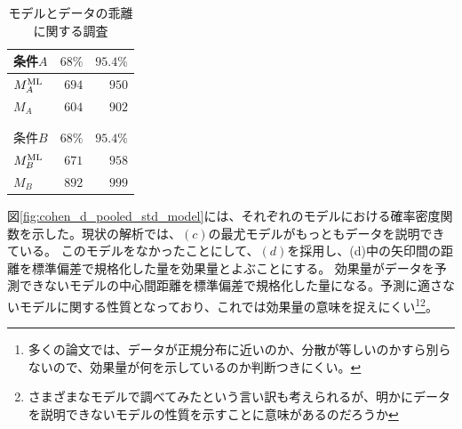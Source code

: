 \begin{table}[hbtp]
 \caption{モデルとデータの乖離に関する調査}
 \label{table:cohen_d_model_data_diff}
 \centering
\begin{tabular}{lrr}
\hline
{}条件$A$ &   $68\%$ &   $95.4\%$ \\
\hline
 $M_A^{\rm{ML}}$& $694$  & $950$ \\
 $M_A$ & $604$  & $902$ \\
\hline \\ \\
\hline
{}条件$B$ &   $68\%$ &   $95.4\%$ \\
\hline
 $M_B^{\rm{ML}}$& $671$  & $958$ \\
 $M_B$ & $892$  & $999$ \\
\hline
\end{tabular}
\end{table}


図\ref{fig:cohen_d_pooled_std_model}には、それぞれのモデルにおける確率密度関数を示した。現状の解析では、$(c)$の最尤モデルがもっともデータを説明できている。
このモデルをなかったことにして、$(d)$を採用し、(d)中の矢印間の距離を標準偏差で規格化した量を効果量とよぶことにする。
効果量がデータを予測できないモデルの中心間距離を標準偏差で規格化した量になる。予測に適さないモデルに関する性質となっており、これでは効果量の意味を捉えにくい\footnote{多くの論文では、データが正規分布に近いのか、分散が等しいのかすら別らないので、効果量が何を示しているのか判断つきにくい。}\footnote{さまざまなモデルで調べてみたという言い訳も考えられるが、明かにデータを説明できないモデルの性質を示すことに意味があるのだろうか}。


